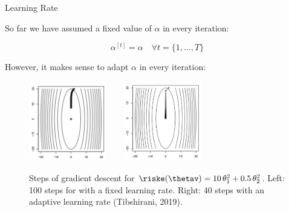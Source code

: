 
\begin{vbframe}{Learning Rate}


So far we have assumed a fixed value of $\alpha$ in every iteration:

\vspace*{-0.2cm}
$$\alpha^{[t]} = \alpha \quad \forall t = {\{1, \ldots, T\}}$$

%
%

However, it makes sense to adapt $\alpha$ in every iteration:


\vspace*{-0.1cm}
\begin{center}
\begin{figure}
\includegraphics[width = 0.3\textwidth]{figure/stepsize_small.png} ~~~ 
\includegraphics[width = 0.3\textwidth]{figure/stepsize_adaptive.png}
\caption{Steps of gradient descent for $\riske(\thetav) = 10\,\theta_1^2 + 0.5\,\theta_2^2$. Left:  100 steps for with a fixed learning rate. Right:  40 steps with an adaptive learning rate (Tibshirani, 2019).}
\end{figure}
\end{center}

\end{vbframe}

